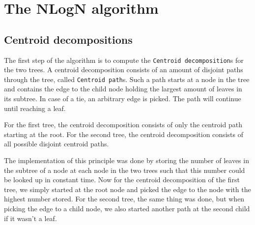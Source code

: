 \chapter{The NLogN algorithm}

\section{Centroid decompositions}
The first step of the algorithm is to compute the \texttt{Centroid decomposition}s for the two trees. A centroid decomposition consists of an amount of disjoint paths through the tree, called \texttt{Centroid path}s. Such a path starts at a node in the tree and contains the edge to the child node holding the largest amount of leaves in its subtree. In case of a tie, an arbitrary edge is picked. The path will continue until reaching a leaf.

For the first tree, the centroid decomposition consists of only the centroid path starting at the root. For the second tree, the centroid decomposition consists of all possible disjoint centroid paths.

The implementation of this principle was done by storing the number of leaves in the subtree of a node at each node in the two trees such that this number could be looked up in constant time. Now for the centroid decomposition of the first tree, we simply started at the root node and picked the edge to the node with the highest number stored. For the second tree, the same thing was done, but when picking the edge to a child node, we also started another path at the second child if it wasn't a leaf.  